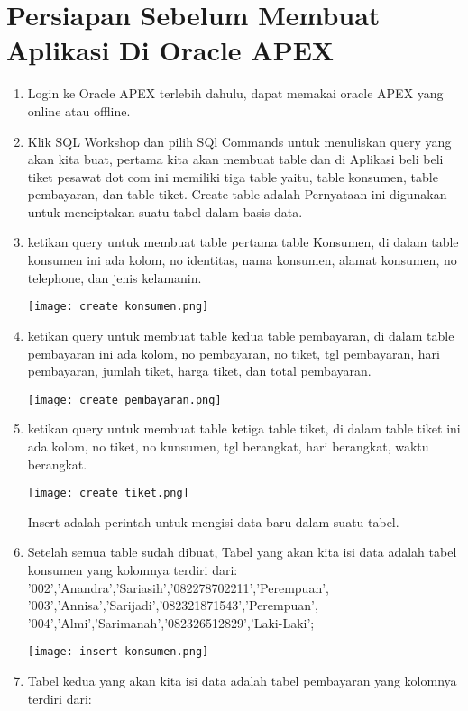 \documentclass{article}
\begin{document}
\section{Persiapan Sebelum Membuat Aplikasi Di Oracle APEX}
\begin{enumerate}
    \item Login ke Oracle APEX terlebih dahulu, dapat memakai oracle APEX yang online atau offline.
    \item Klik SQL Workshop dan pilih SQl Commands untuk menuliskan query yang akan kita buat, pertama kita akan membuat table dan di Aplikasi beli beli tiket pesawat dot com ini memiliki tiga table yaitu, table konsumen, table pembayaran, dan table tiket.
    Create table adalah Pernyataan ini digunakan untuk menciptakan suatu tabel dalam basis data.
    \item ketikan query untuk membuat table pertama table Konsumen, di dalam table konsumen ini ada kolom, no identitas, nama konsumen, alamat konsumen, no telephone, dan jenis kelamanin.  
    \begin{center}
    \texttt{[image: create konsumen.png]}
    \end{center}
    \item ketikan query untuk membuat table kedua table pembayaran, di dalam table pembayaran ini ada kolom, no pembayaran, no tiket, tgl pembayaran, hari pembayaran, jumlah tiket, harga tiket, dan total pembayaran. 
    \begin{center}
    \texttt{[image: create pembayaran.png]}
    \end{center}
    \item ketikan query untuk membuat table ketiga table tiket, di dalam table tiket ini ada kolom, no tiket, no kunsumen, tgl berangkat, hari berangkat, waktu berangkat.
    \begin{center}
    \texttt{[image: create tiket.png]}
    \end{center}
    Insert adalah perintah untuk mengisi data baru dalam suatu tabel.
    \item Setelah semua table sudah dibuat, Tabel yang akan kita isi data adalah tabel konsumen yang kolomnya terdiri dari: '002','Anandra','Sariasih','082278702211','Perempuan', '003','Annisa','Sarijadi','082321871543','Perempuan', 
    '004','Almi','Sarimanah','082326512829','Laki-Laki';
    \begin{center}
    \texttt{[image: insert konsumen.png]}
    \end{center}
    \item Tabel kedua yang akan kita isi data adalah tabel pembayaran yang kolomnya terdiri dari: 

\end{enumerate}
\end{document}
